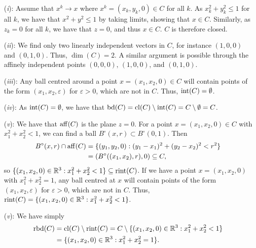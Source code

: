 \begin{solution}
  (\textit{i}): Assume that $x^k \to x$ where $x^k = (x_k, y_k, 0) \in C$ for all $k$.
  As $x_k^2 + y_k^2 \leq 1$ for all $k$, we have that $x^2 + y^2 \leq 1$ by taking limits, showing that $x \in C$.
  Similarly, as $z_k = 0$ for all $k$, we have that $z = 0$, and thus $x \in C$.
  $C$ is therefore closed.

  (\textit{ii}): We find only two linearly independent vectors in $C$, for instance $(1, 0, 0)$ and $(0, 1, 0)$.
  Thus, $\dim(C) = 2$.
  A similar argument is possible through the affinely independent points $(0, 0, 0)$, $(1, 0, 0)$, and $(0, 1, 0)$.

  (\textit{iii}): Any ball centred around a point $x = (x_1, x_2, 0) \in C$ will contain points of the form $(x_1, x_2, \varepsilon)$ for $\varepsilon > 0$, which are not in $C$.
  Thus, $\operatorname*{int}(C) = \emptyset$.

  (\textit{iv}): As $\operatorname*{int}(C) = \emptyset$, we have that $\operatorname*{bd}(C) = \operatorname*{cl}(C) \setminus \operatorname*{int}(C) = C \setminus \emptyset = C$.

  (\textit{v}): We have that $\operatorname*{aff}(C)$ is the plane $z = 0$.
  For a point $x = (x_1, x_2, 0) \in C$ with $x_1^2 + x_2^2 < 1$, we can find a ball $B^\circ(x, r) \subset B^\circ(0, 1)$.
  Then
  \begin{equation}
    \begin{split}
      B^\circ(x, r) \cap \operatorname*{aff}(C)
      &= \{ (y_1, y_2, 0) : (y_1 - x_1)^2 + (y_2 - x_2)^2 < r^2 \} \\
      &= (B^\circ((x_1, x_2), r), 0) \subseteq C,
    \end{split}
  \end{equation}
  so $\{ (x_1, x_2, 0) \in \mathbb{R}^3 : x_1^2 + x_2^2 < 1 \} \subseteq \operatorname*{rint}(C)$.
  If we have a point $x = (x_1, x_2, 0)$ with $x_1^2 + x_2^2 = 1$, any ball centred at $x$ will contain points of the form $(x_1, x_2, \varepsilon)$ for $\varepsilon > 0$, which are not in $C$.
  Thus, $\operatorname*{rint}(C) = \{ (x_1, x_2, 0) \in \mathbb{R}^3 : x_1^2 + x_2^2 < 1 \}$.

  (\textit{v}): We have simply
  \begin{equation}
    \begin{split}
      \operatorname*{rbd}(C) &= \operatorname*{cl}(C) \setminus \operatorname*{rint}(C) = C \setminus \{ (x_1, x_2, 0) \in \mathbb{R}^3 : x_1^2 + x_2^2 < 1 \} \\
      &= \{ (x_1, x_2, 0) \in \mathbb{R}^3 : x_1^2 + x_2^2 = 1 \}.
    \end{split}
  \end{equation}
\end{solution}


